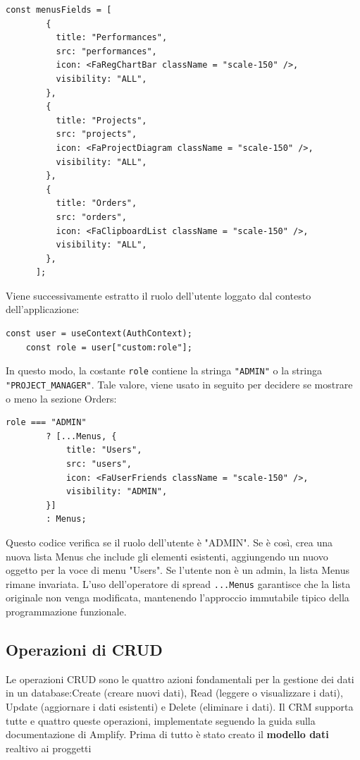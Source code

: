 \documentclass[target=bach,aauheader=,style=]{thud}
\begin{document}
\begin{lstlisting}[caption=Campi default visibili nella sidebar]
    const menusFields = [
        {
          title: "Performances",
          src: "performances",
          icon: <FaRegChartBar className = "scale-150" />,
          visibility: "ALL",
        },
        {
          title: "Projects",
          src: "projects",
          icon: <FaProjectDiagram className = "scale-150" />,
          visibility: "ALL",
        },
        {
          title: "Orders",
          src: "orders",
          icon: <FaClipboardList className = "scale-150" />,
          visibility: "ALL",
        },
      ];
\end{lstlisting}

\noindent Viene successivamente estratto il ruolo dell'utente loggato dal contesto dell'applicazione:

\begin{lstlisting}[caption=Parte del file \texttt{AuthenticatedLayout.tsx} del CRM]
    const user = useContext(AuthContext);
    const role = user["custom:role"];
\end{lstlisting}

\noindent In questo modo, la costante \texttt{role} contiene la stringa \texttt{"ADMIN"} o la stringa  \texttt{"PROJECT\_MANAGER"}. Tale valore, viene usato in seguito per decidere se mostrare o meno la sezione Orders:

\begin{lstlisting}[caption=Verifica ruolo]
    role === "ADMIN" 
        ? [...Menus, {
            title: "Users",
            src: "users",
            icon: <FaUserFriends className = "scale-150" />,
            visibility: "ADMIN",
        }]
        : Menus;
\end{lstlisting}

\noindent Questo codice verifica se il ruolo dell'utente è "ADMIN". Se è così, crea una nuova lista Menus che include gli elementi esistenti, aggiungendo un nuovo oggetto per la voce di menu "Users". Se l'utente non è un admin, la lista Menus rimane invariata. L'uso dell'operatore di spread \texttt{...Menus} garantisce che la lista originale non venga modificata, mantenendo l'approccio immutabile tipico della programmazione funzionale.

\subsection{Operazioni di CRUD}
Le operazioni CRUD sono le quattro azioni fondamentali per la gestione dei dati in un database:Create (creare nuovi dati), Read (leggere o visualizzare i dati), Update (aggiornare i dati esistenti) e Delete (eliminare i dati). Il CRM supporta tutte e quattro queste operazioni, implementate seguendo la guida \cite{awsamplifynextjs2024} sulla documentazione di Amplify. Prima di tutto è stato creato il \textbf{modello dati} realtivo ai proggetti
\end{document}
